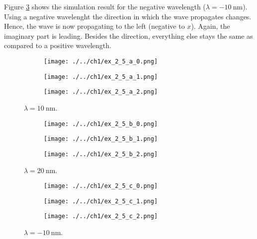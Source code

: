 Figure \ref{fig:ex_2_5_c} shows the simulation result for the negative
wavelength ($\lambda = \SI{-10}{\nano\m}$). Using a negative wavelenght the
direction in which the wave propagates changes. Hence, the wave is now
propagating to the left (negative to $x$). Again, the imaginary part is leading.
Besides the direction, everything else stays the same as compared to a
positive wavelength.

\newpage

\begin{figure}
	\centering
	\begin{subfigure}{1\linewidth}
		\texttt{[image: ./../ch1/ex\_2\_5\_a\_0.png]}
	\end{subfigure}

	\begin{subfigure}{1\linewidth}
		\texttt{[image: ./../ch1/ex\_2\_5\_a\_1.png]}
	\end{subfigure}
	
	\begin{subfigure}{1\linewidth}
		\texttt{[image: ./../ch1/ex\_2\_5\_a\_2.png]}
	\end{subfigure}
	
	\caption{$\lambda = \SI{10}{\nano\m}$.}
	\label{fig:ex_2_5_a}
\end{figure}

\newpage

\begin{figure}
	\centering
	\begin{subfigure}{1\linewidth}
		\texttt{[image: ./../ch1/ex\_2\_5\_b\_0.png]}
	\end{subfigure}

	\begin{subfigure}{1\linewidth}
		\texttt{[image: ./../ch1/ex\_2\_5\_b\_1.png]}
	\end{subfigure}
	
	\begin{subfigure}{1\linewidth}
		\texttt{[image: ./../ch1/ex\_2\_5\_b\_2.png]}
	\end{subfigure}
	
	\caption{$\lambda = \SI{20}{\nano\m}$.}
	\label{fig:ex_2_5_b}
\end{figure}

\newpage

\begin{figure}
	\centering
	\begin{subfigure}{1\linewidth}
		\texttt{[image: ./../ch1/ex\_2\_5\_c\_0.png]}
	\end{subfigure}

	\begin{subfigure}{1\linewidth}
		\texttt{[image: ./../ch1/ex\_2\_5\_c\_1.png]}
	\end{subfigure}
	
	\begin{subfigure}{1\linewidth}
		\texttt{[image: ./../ch1/ex\_2\_5\_c\_2.png]}
	\end{subfigure}
	
	\caption{$\lambda = \SI{-10}{\nano\m}$.}
	\label{fig:ex_2_5_c}
\end{figure}

